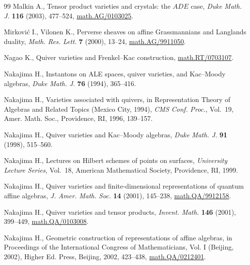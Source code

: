 \documentclass[10pt,a4paper]{amsart}
\theoremstyle{definition}
\numberwithin{equation}{section}
\begin{document}
\begin{thebibliography}{99}
Malkin A.,  Tensor product varieties and crystals: the {$ADE$} case, {\it Duke
  Math. J.} \textbf{116} (2003),  477--524, \href{http://arxiv.org/abs/math.AG/0103025}{math.AG/0103025}. %

Mirkovi{\'c} I., Vilonen K.,  Perverse sheaves on af\/f\/ine
  {G}rassmannians and {L}anglands duality, {\it Math. Res. Lett.} \textbf{7} (2000),
 13--24, \href{http://arxiv.org/abs/math.AG/9911050}{math.AG/9911050}. %

Nagao K.,  Quiver varieties and Frenkel--Kac construction,   \href{http://arxiv.org/abs/math.RT/0703107}{math.RT/0703107}.

Nakajima H., Instantons on {ALE} spaces, quiver varieties, and
  Kac--Moody algebras, {\it Duke Math. J.} \textbf{76} (1994), 365--416.

Nakajima H., Varieties associated with quivers, in Representation Theory of
  Algebras and Related Topics (Mexico City, 1994), {\it CMS Conf. Proc.}, Vol.~19,
  Amer. Math. Soc., Providence, RI, 1996, 139--157.

Nakajima H., Quiver varieties and Kac--Moody algebras, {\it Duke Math. J.}
  \textbf{91} (1998), 515--560. %

Nakajima H., Lectures on Hilbert schemes of points on surfaces, {\it University
  Lecture Series}, Vol.~18, American Mathematical Society, Providence, RI, 1999.

Nakajima H., Quiver varieties and f\/inite-dimensional representations of
  quantum af\/f\/ine algebras, {\it J. Amer. Math. Soc.} \textbf{14} (2001),
  145--238, \href{http://arxiv.org/abs/math.QA/9912158}{math.QA/9912158}. %

Nakajima H., Quiver varieties and tensor products, {\it Invent. Math.}
  \textbf{146} (2001), 399--449, \href{http://arxiv.org/abs/math.QA/0103008}{math.QA/0103008}. %

Nakajima H., Geometric construction of representations of af\/f\/ine algebras,
  in Proceedings of the International Congress of Mathematicians, Vol. I (Beijing,
  2002), Higher Ed. Press, Beijing, 2002, 423--438, \href{http://arxiv.org/abs/math.QA/0212401}{math.QA/0212401}. %


\end{thebibliography}
\end{document}
